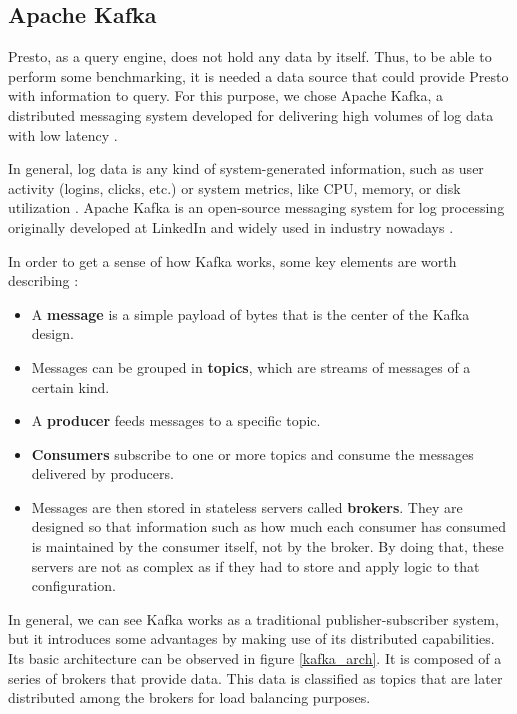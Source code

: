 \documentclass[conference]{IEEEtran}
\begin{document}
\subsection{Apache Kafka}
Presto, as a query engine, does not hold any data by itself. Thus, to be able to perform some benchmarking, it is needed a data source that could provide Presto with information to query. For this purpose, we chose Apache Kafka, a distributed messaging system developed for delivering high volumes of log data with low latency \cite{kreps-2011}.

In general, log data is any kind of system-generated information, such as user activity (logins, clicks, etc.) or system metrics, like CPU, memory, or disk utilization \cite{kreps-2011}. Apache Kafka is an open-source messaging system for log processing originally developed at LinkedIn and widely used in industry nowadays \cite{me-me-thein-2014}.

In order to get a sense of how Kafka works, some key elements are worth describing \cite{kreps-2011}:

\begin{itemize}
    \item A \textbf{message} is a simple payload of bytes that is the center of the Kafka design.
    \item Messages can be grouped in \textbf{topics}, which are streams of messages of a certain kind.
    \item A \textbf{producer} feeds messages to a specific topic.
    \item \textbf{Consumers} subscribe to one or more topics and consume the messages delivered by producers.
    \item Messages are then stored in stateless servers called \textbf{brokers}. They are designed so that information such as how much each consumer has consumed is maintained by the consumer itself, not by the broker. By doing that, these servers are not as complex as if they had to store and apply logic to that configuration.
\end{itemize}

In general, we can see Kafka works as a traditional publisher-subscriber system, but it introduces some advantages by making use of its distributed capabilities. Its basic architecture can be observed in figure \ref{kafka_arch}. It is composed of a series of brokers that provide data. This data is classified as topics that are later distributed among the brokers for load balancing purposes.
\end{document}
